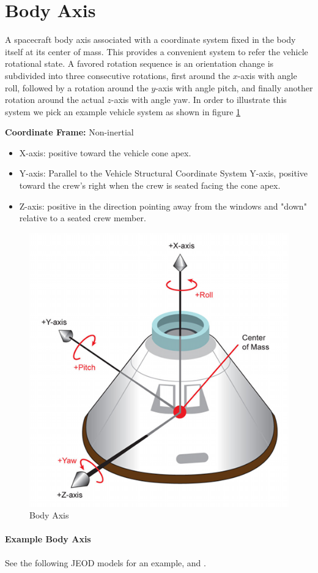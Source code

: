 
\section{Body Axis } \label{sec:body} 
A spacecraft body axis associated with a coordinate system fixed in the body itself at its center of mass. This provides a convenient system to refer the vehicle rotational state.
A favored rotation sequence is  an orientation change is subdivided into three consecutive rotations, first around the $x$-axis with angle roll, followed by a rotation around the $y$-axis with angle pitch, and finally another rotation around the actual $z$-axis with angle yaw. 
In order to illustrate this system we pick an example vehicle system as shown in figure \ref{fig:10}

\textbf{Coordinate Frame:} Non-inertial

\begin{itemize}
\item X-axis: positive toward the vehicle cone apex.
\item Y-axis: Parallel to the Vehicle Structural Coordinate System Y-axis, positive toward the crew's right when the crew is seated facing the cone apex.
\item Z-axis: positive in the direction pointing away from the windows and "down" relative to a seated crew member.
\end{itemize}

\begin{figure}[htp]
\centering
\includegraphics [width=7in]{figs/fig10.png}
\caption{Body Axis}
\label{fig:10}
\end{figure}

\paragraph{Example Body Axis}
See the following JEOD models for an example,  and .



